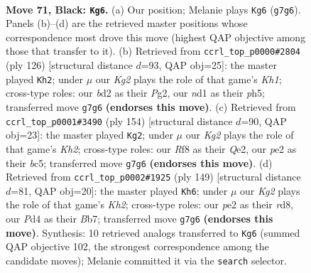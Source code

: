 \documentclass[11pt]{article}
\begin{document}
\clearpage

\begin{figure}[p]\centering
\begin{subfigure}{0.46\textwidth}\centering
\resizebox{\linewidth}{!}{%
\newchessgame
\chessboard[
  setfen={5r2/q3b1k1/4Qn2/P1p2p2/3p1Pp1/8/1R1BPK2/3N4 b - - 3 71},
  showmover=false,
  pgfstyle=straightmove, color=movearrow, markmove={g7-g6}
]}
\caption{}
\end{subfigure}\hfill
\begin{subfigure}{0.46\textwidth}\centering
\resizebox{\linewidth}{!}{%
\newchessgame
\chessboard[
  setfen={8/4b1k1/pBn3p1/P2qp2p/4N3/2Q2P1P/6P1/7K w - - 10 64},
  showmover=false,
  pgfstyle=straightmove, color=movearrow, markmove={h1-h2}
]}
\caption{}
\end{subfigure}
\\[4pt]
\begin{subfigure}{0.46\textwidth}\centering
\resizebox{\linewidth}{!}{%
\newchessgame
\chessboard[
  setfen={8/5pk1/6p1/2bP4/3qp2P/1P4P1/4QP1K/3B4 w - - 0 78},
  showmover=false,
  pgfstyle=straightmove, color=movearrow, markmove={h2-g2}
]}
\caption{}
\end{subfigure}\hfill
\begin{subfigure}{0.46\textwidth}\centering
\resizebox{\linewidth}{!}{%
\newchessgame
\chessboard[
  setfen={3R1Q2/1b4rk/6p1/5p1p/1pB1p3/1P4PP/5K2/q7 b - - 4 75},
  showmover=false,
  pgfstyle=straightmove, color=movearrow, markmove={h7-h6}
]}
\caption{}
\end{subfigure}
\caption{\textbf{Move 71, Black: \texttt{Kg6}.} (a) Our position; Melanie plays \texttt{Kg6} (\texttt{g7g6}). Panels (b)--(d) are the retrieved master positions whose correspondence most drove this move (highest QAP objective among those that transfer to it). (b) Retrieved from \texttt{ccrl\_top\_p0000\#2804} (ply 126) [structural distance $d$=93, QAP obj=25]: the master played \texttt{Kh2}; under $\mu$ our \emph{Kg2} plays the role of that game's \emph{Kh1}; cross-type roles: our \emph{b}d2 as their \emph{P}g2, our \emph{n}d1 as their \emph{p}h5; transferred move \texttt{g7g6} \textbf{(endorses this move)}. (c) Retrieved from \texttt{ccrl\_top\_p0001\#3490} (ply 154) [structural distance $d$=90, QAP obj=23]: the master played \texttt{Kg2}; under $\mu$ our \emph{Kg2} plays the role of that game's \emph{Kh2}; cross-type roles: our \emph{R}f8 as their \emph{Q}e2, our \emph{p}e2 as their \emph{b}c5; transferred move \texttt{g7g6} \textbf{(endorses this move)}. (d) Retrieved from \texttt{ccrl\_top\_p0002\#1925} (ply 149) [structural distance $d$=81, QAP obj=20]: the master played \texttt{Kh6}; under $\mu$ our \emph{Kg2} plays the role of that game's \emph{Kh2}; cross-type roles: our \emph{p}e2 as their \emph{r}d8, our \emph{P}d4 as their \emph{B}b7; transferred move \texttt{g7g6} \textbf{(endorses this move)}. Synthesis: 10 retrieved analogs transferred to \texttt{Kg6} (summed QAP objective 102, the strongest correspondence among the candidate moves); Melanie committed it via the \texttt{search} selector.}
\label{fig:thought-m141}
\end{figure}
\end{document}
